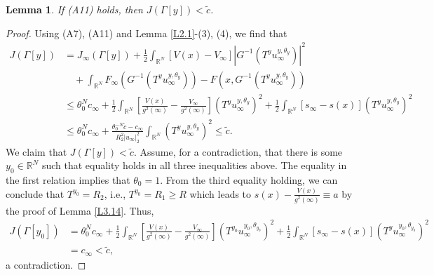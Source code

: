 \documentclass[10pt,a4paper]{amsart}
\numberwithin{equation}{section}
\newtheorem{lemma}[theorem]{Lemma}
\begin{document}
\begin{lemma}\label{L3.18}
 If {\rm (A11) } holds, then $J(\Gamma[y])<\tilde{c}$.
\end{lemma}

\begin{proof} 
Using (A7), (A11) and Lemma \ref{L2.1}-(3), (4), we find that
\begin{align*}
J(\Gamma[y])
&=J_\infty(\Gamma[y])+\frac{1}{2}\int_{\mathbb{R}^N}[V(x)-V_\infty]|G^{-1}(T^yu_\infty^{y,\theta_y})|^2\\
&\quad +\int_{\mathbb{R}^N}F_\infty(G^{-1}(T^yu_\infty^{y,\theta_y}))-F(x,G^{-1}(T^yu_\infty^{y,\theta_y}))\\
&\leq\theta_0^{N}c_\infty+\frac{1}{2}\int_{\mathbb{R}^N}[\frac{V(x)}{g^2(\infty)}-\frac{V_\infty}{g^2(\infty)}](T^yu_\infty^{y,\theta_y})^2
  +\frac{1}{2}\int_{\mathbb{R}^N}[s_\infty-s(x)](T^yu_\infty^{y,\theta_y})^2\\
&\leq\theta_0^{N}c_\infty+\frac{\theta^{-N}_0\tilde{c}-c_\infty}{R^2_2|u_\infty|^2_2}\int_{\mathbb{R}^N}(T^yu_\infty^{y,\theta_y})^2\leq\tilde{c}.
\end{align*}
We claim that $J(\Gamma[y])<\tilde{c}$. Assume, for a contradiction, that there is some 
$y_0\in{\mathbb{R}^N}$ such that equality holds in all three inequalities above. 
The equality in the first relation implies that $\theta_0=1$. From the third equality holding, 
we can conclude that $T^{y_0}=R_2$, i.e., $T^{y_0}=R_1\geq R$ which leads to 
$s(x)-\frac{V(x)}{g^2(\infty)}\equiv a$ by the proof of Lemma \ref{L3.14}. Thus,
\begin{align*}
J(\Gamma[{y_0}])
&=\theta_0^{N}c_\infty+\frac{1}{2}\int_{\mathbb{R}^N}[\frac{V(x)}{g^2(\infty)}-\frac{V_\infty}{g^2(\infty)}](T^{y_0}u_\infty^{{y_0},\theta_{y_0}})^2
 +\frac{1}{2}\int_{\mathbb{R}^N}[s_\infty-s(x)](T^yu_\infty^{{y_0},\theta_{y_0}})^2\\
&=c_\infty<\tilde{c},
\end{align*} 
a contradiction.
\end{proof}
\end{document}
